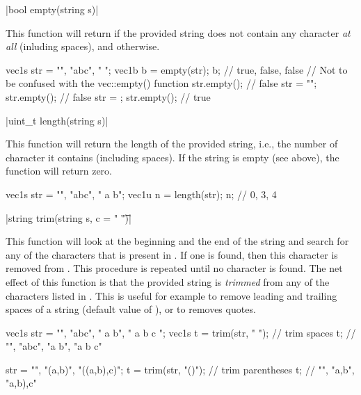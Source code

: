 \funcitem \vectorfunc \cppinline|bool empty(string s)| 

This function will return \cpptrue if the provided string does not contain any character \emph{at all} (inluding spaces), and \cppfalse otherwise.

\begin{example}
\begin{cppcode}
vec1s str = {"", "abc", "   "};
vec1b b = empty(str);
b; // {true, false, false}
// Not to be confused with the vec::empty() function
str.empty(); // false
str = {""};
str.empty(); // false
str = {};
str.empty(); // true
\end{cppcode}
\end{example}

\funcitem \vectorfunc \cppinline|uint_t length(string s)| 

This function will return the length of the provided string, i.e., the number of character it contains (including spaces). If the string is empty (see above), the function will return zero.

\begin{example}
\begin{cppcode}
vec1s str = {"", "abc", " a b"};
vec1u n = length(str);
n; // {0, 3, 4}
\end{cppcode}
\end{example}

\funcitem \vectorfunc \cppinline|string trim(string s, c = " \t")| 

This function will look at the beginning and the end of the string  and search for any of the characters that is present in . If one is found, then this character is removed from . This procedure is repeated until no character is found. The net effect of this function is that the provided string  is \emph{trimmed} from any of the characters listed in . This is useful for example to remove leading and trailing spaces of a string (default value of ), or to removes quotes.

\begin{example}
\begin{cppcode}
vec1s str = {"", "abc", " a b", " a b c  "};
vec1s t = trim(str, " "); // trim spaces
t; // {"", "abc", "a b", "a b c"}

str = {"", "(a,b)", "((a,b),c)"};
t = trim(str, "()"); // trim parentheses
t; // {"", "a,b", "a,b),c"}
\end{cppcode}
\end{example}

